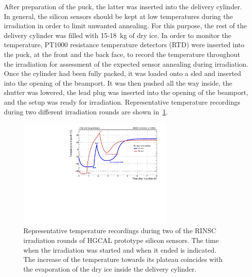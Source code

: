 After preparation of the puck, the latter was inserted into the delivery cylinder.
In general, the silicon sensors should be kept at low temperatures during the irradiation in order to limit unwanted annealing.
For this purpose, the rest of the delivery cylinder was filled with 15-\SI{18}{\kilo\gram} of dry ice.
In order to monitor the temperature, PT1000 resistance temperature detectors (RTD) were inserted into the puck, at the front and the back face, to record the temperature throughout the irradiation for assessment of the expected sensor annealing during irradiation. 
Once the cylinder had been fully packed, it was loaded onto a sled and inserted into the opening of the beamport.
It was then pushed all the way inside, the shutter was lowered, the lead plug was inserted into the opening of the beamport, and the setup was ready for irradiation.
Representative temperature recordings during two different irradiation rounds are shown in~\ref{fig:Round_10_Temperature_Profile}.
\begin{figure}[!hbt]
  \begin{center}
    \includegraphics[width=0.69\textwidth]{plots/RINSC_temp/RINSC_temp.pdf}
    \caption{Representative temperature recordings during two of the RINSC irradiation rounds of HGCAL prototype silicon sensors. 
    The time when the irradiation was started and when it ended is indicated.
    The increase of the temperature towards its plateau coincides with the evaporation of the dry ice inside the delivery cylinder.
    }
    \label{fig:Round_10_Temperature_Profile}
  \end{center}
\end{figure}
